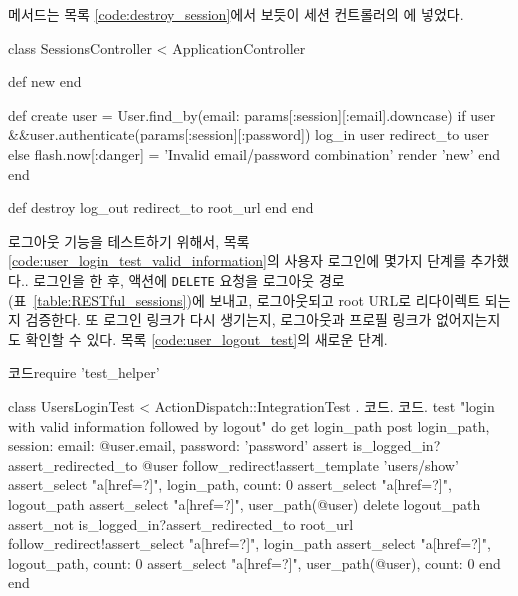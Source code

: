  메서드는 목록 \ref{code:destroy_session}에서 보듯이 세션 컨트롤러의  에 넣었다. 

\begin{codelisting} \label{code:destroy_session}  

\begin{code} class SessionsController < ApplicationController 

def new end 

def create user = User.find_by(email: params[:session][:email].downcase) if user &&user.authenticate(params[:session][:password]) log_in user redirect_to user else flash.now[:danger] = 'Invalid email/password combination' render 'new' end end 

def destroy log_out redirect_to root_url end end \end{code} \end{codelisting} 

로그아웃 기능을 테스트하기 위해서, 목록 \ref{code:user_login_test_valid_information}의 사용자 로그인에 몇가지 단계를 추가했다.. 로그인을 한 후,  액션에 \texttt{DELETE} 요청을 로그아웃 경로(표~\ref{table:RESTful_sessions})에 보내고, 로그아웃되고 root URL로 리다이렉트 되는지 검증한다. 또 로그인 링크가 다시 생기는지, 로그아웃과 프로필 링크가 없어지는지도 확인할 수 있다. 목록 \ref{code:user_logout_test}의 새로운 단계. 

\begin{codelisting} \label{code:user_logout_test}  

\begin{code} 코드require 'test_helper' 

class UsersLoginTest < ActionDispatch::IntegrationTest . 코드. 코드. test "login with valid information followed by logout" do get login_path post login_path, session: { email: @user.email, password: 'password' } assert is_logged_in?assert_redirected_to @user follow_redirect!assert_template 'users/show' assert_select "a[href=?]", login_path, count: 0 assert_select "a[href=?]", logout_path assert_select "a[href=?]", user_path(@user) delete logout_path assert_not is_logged_in?assert_redirected_to root_url follow_redirect!assert_select "a[href=?]", login_path assert_select "a[href=?]", logout_path, count: 0 assert_select "a[href=?]", user_path(@user), count: 0 end end \end{code} \end{codelisting} 


